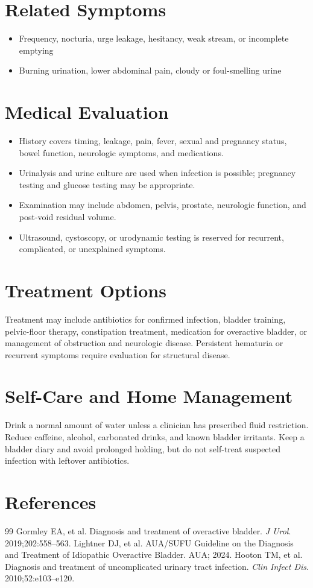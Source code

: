\section*{Related Symptoms}
\begin{itemize}
  \item Frequency, nocturia, urge leakage, hesitancy, weak stream, or incomplete emptying
  \item Burning urination, lower abdominal pain, cloudy or foul-smelling urine
\end{itemize}

\section*{Medical Evaluation}
\begin{itemize}
  \item History covers timing, leakage, pain, fever, sexual and pregnancy status, bowel function, neurologic symptoms, and medications.
  \item Urinalysis and urine culture are used when infection is possible; pregnancy testing and glucose testing may be appropriate.
  \item Examination may include abdomen, pelvis, prostate, neurologic function, and post-void residual volume.
  \item Ultrasound, cystoscopy, or urodynamic testing is reserved for recurrent, complicated, or unexplained symptoms.
\end{itemize}

\section*{Treatment Options}
Treatment may include antibiotics for confirmed infection, bladder training, pelvic-floor therapy, constipation treatment, medication for overactive bladder, or management of obstruction and neurologic disease. Persistent hematuria or recurrent symptoms require evaluation for structural disease.

\section*{Self-Care and Home Management}
Drink a normal amount of water unless a clinician has prescribed fluid restriction. Reduce caffeine, alcohol, carbonated drinks, and known bladder irritants. Keep a bladder diary and avoid prolonged holding, but do not self-treat suspected infection with leftover antibiotics.

\section*{References}
\begin{thebibliography}{99}
 Gormley EA, et al. Diagnosis and treatment of overactive bladder. \textit{J Urol}. 2019;202:558--563.
 Lightner DJ, et al. AUA/SUFU Guideline on the Diagnosis and Treatment of Idiopathic Overactive Bladder. AUA; 2024.
 Hooton TM, et al. Diagnosis and treatment of uncomplicated urinary tract infection. \textit{Clin Infect Dis}. 2010;52:e103--e120.
\end{thebibliography}
